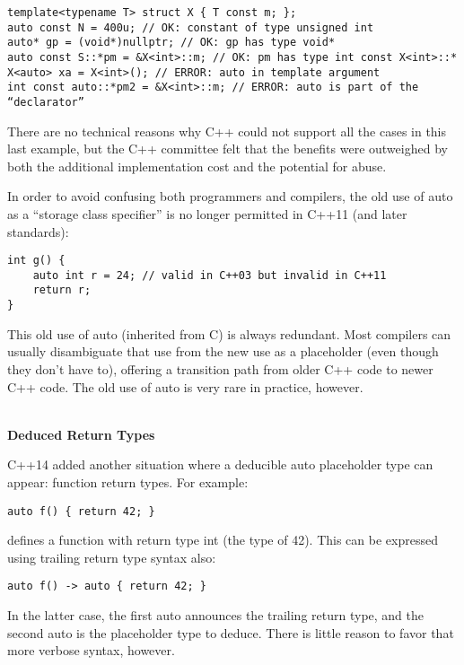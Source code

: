 \begin{lstlisting}[style=styleCXX]
template<typename T> struct X { T const m; };
auto const N = 400u; // OK: constant of type unsigned int
auto* gp = (void*)nullptr; // OK: gp has type void*
auto const S::*pm = &X<int>::m; // OK: pm has type int const X<int>::*
X<auto> xa = X<int>(); // ERROR: auto in template argument
int const auto::*pm2 = &X<int>::m; // ERROR: auto is part of the “declarator”
\end{lstlisting}

There are no technical reasons why C++ could not support all the cases in this last example, but the C++ committee felt that the benefits were outweighed by both the additional implementation cost and the potential for abuse.

In order to avoid confusing both programmers and compilers, the old use of auto as a “storage class specifier” is no longer permitted in C++11 (and later standards):

\begin{lstlisting}[style=styleCXX]
int g() {
	auto int r = 24; // valid in C++03 but invalid in C++11
	return r;
}
\end{lstlisting}

This old use of auto (inherited from C) is always redundant. Most compilers can usually disambiguate that use from the new use as a placeholder (even though they don’t have to), offering a transition path from older C++ code to newer C++ code. The old use of auto is very rare in practice, however.

\hspace*{\fill} \\ %
\noindent
\textbf{Deduced Return Types}

C++14 added another situation where a deducible auto placeholder type can appear: function return types. For example:

\begin{lstlisting}[style=styleCXX]
auto f() { return 42; }
\end{lstlisting}

defines a function with return type int (the type of 42). This can be expressed using trailing return type syntax also:

\begin{lstlisting}[style=styleCXX]
auto f() -> auto { return 42; }
\end{lstlisting}

In the latter case, the first auto announces the trailing return type, and the second auto is the placeholder type to deduce. There is little reason to favor that more verbose syntax, however.

